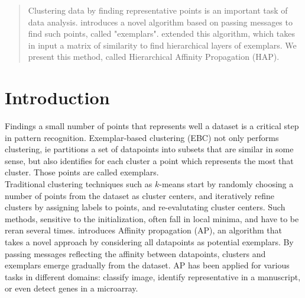 \documentclass{ipol}
\begin{document}
\begin{abstract}

Clustering data by finding representative points is an important task of data
analysis. \cite{frey07affinitypropagation} introduces a novel
algorithm based on passing messages to find such points, called "exemplars".
\cite{hap} extended this algorithm, which takes in input a matrix of
similarity to find hierarchical layers of exemplars.
We present this method, called Hierarchical Affinity Propagation (HAP).

\end{abstract}

\begin{ipolCode}
\end{ipolCode}

\begin{ipolSupp}
\end{ipolSupp}

\section{Introduction}

Findings a small number of points that represents well a dataset is a critical
step in pattern recognition. Exemplar-based clustering (EBC) not only performs
clustering, ie partitions a set of datapoints into subsets that are similar in
some sense, but also identifies for each cluster a point which represents the
most that cluster. Those points are called exemplars.\\

Traditional clustering techniques such as $k$-means start by randomly choosing a
number of points from the dataset as cluster centers, and iteratively refine
clusters by assigning labels to points, and re-evalutating cluster centers.
Such methods, sensitive to the initialization, often fall in local minima, and
have to be reran several times. \cite{frey07affinitypropagation} introduces
Affinity propagation (AP), an algorithm that takes a novel approach by
considering all datapoints as potential exemplars. By passing messages
reflecting the affinity between datapoints, clusters and exemplars emerge
gradually from the dataset. AP has been applied for various tasks in different
domains: classify image, identify representative in a manuscript, or even
detect genes in a microarray.\\
\end{document}

